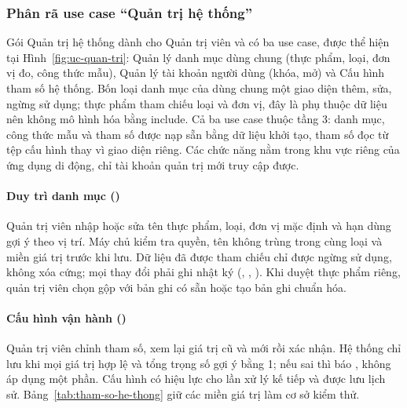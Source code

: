 \subsubsection{Phân rã use case “Quản trị hệ thống”}\label{sssec:pr-quan-tri}

Gói Quản trị hệ thống dành cho Quản trị viên và có ba use case, được thể hiện tại Hình~\ref{fig:uc-quan-tri}:  Quản lý danh mục dùng chung (thực phẩm, loại, đơn vị đo, công thức mẫu),  Quản lý tài khoản người dùng (khóa, mở) và  Cấu hình tham số hệ thống. Bốn loại danh mục của  dùng chung một giao diện thêm, sửa, ngừng sử dụng; thực phẩm tham chiếu loại và đơn vị, đây là phụ thuộc dữ liệu nên không mô hình hóa bằng include. Cả ba use case thuộc tầng 3: danh mục, công thức mẫu và tham số được nạp sẵn bằng dữ liệu khởi tạo, tham số đọc từ tệp cấu hình thay vì giao diện riêng. Các chức năng nằm trong khu vực riêng của ứng dụng di động, chỉ tài khoản quản trị mới truy cập được.


\paragraph{Duy trì danh mục ()}
Quản trị viên nhập hoặc sửa tên thực phẩm, loại, đơn vị mặc định và hạn dùng gợi ý theo vị trí. Máy chủ kiểm tra quyền, tên không trùng trong cùng loại và miền giá trị trước khi lưu. Dữ liệu đã được tham chiếu chỉ được ngừng sử dụng, không xóa cứng; mọi thay đổi phải ghi nhật ký (, , ). Khi duyệt thực phẩm riêng, quản trị viên chọn gộp với bản ghi có sẵn hoặc tạo bản ghi chuẩn hóa.

\paragraph{Cấu hình vận hành ()}
Quản trị viên chỉnh tham số, xem lại giá trị cũ và mới rồi xác nhận. Hệ thống chỉ lưu khi mọi giá trị hợp lệ và tổng trọng số gợi ý bằng 1; nếu sai thì báo , không áp dụng một phần. Cấu hình có hiệu lực cho lần xử lý kế tiếp và được lưu lịch sử. Bảng~\ref{tab:tham-so-he-thong} giữ các miền giá trị làm cơ sở kiểm thử.

